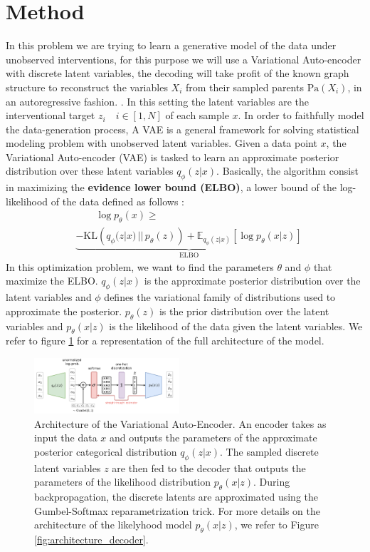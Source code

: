 \documentclass{article}
\begin{document}
\section{Method}\label{subsec:Method}
In this problem we are trying to learn a generative model of the data under unobserved interventions, for this purpose we will use a Variational Auto-encoder \citep{kingma2022autoencodingvariationalbayes}
with discrete latent variables, the decoding will take profit of the known graph structure to reconstruct the variables $X_i$ from their sampled parents $\text{Pa}(X_i)$, in an autoregressive fashion.
. In this setting the latent variables are the interventional target $z_i \quad i \in [1,N]$ of each sample $x$. In order to faithfully model the data-generation process,
A VAE is a general framework for solving statistical modeling problem with unobserved latent variables. Given a data point $x$, the Variational Auto-encoder (VAE) is tasked to learn an approximate posterior distribution over these latent variables $q_\phi(z | x)$. Basically, the algorithm consist in maximizing the \textbf{evidence lower bound (ELBO)}, a lower bound of the log-likelihood of the data defined as follows :
\begin{align*}
    &\quad\quad \log p_\theta(x) \geq  \\
    & \underbrace{ - \text{KL}\left(q_\phi(z | x) \,||\, p_\theta(z)\right)+ \mathbb{E}_{q_\phi(z | x)} \left[ \log p_\theta(x | z) \right]}_{\text{ELBO}}
\end{align*}
In this optimization problem, we want to find the parameters $\theta$ and $\phi$ that maximize the ELBO. $q_\phi(z | x)$ is the approximate posterior distribution over the latent variables and $\phi$ defines the variational family of distributions used to approximate the posterior. $p_\theta(z)$ is the prior distribution over the latent variables and $p_\theta(x | z)$ is the likelihood of the data given the latent variables. We refer to figure \ref{fig:architecture} for a representation of the full architecture of the model.
\begin{figure}
\centering
    \includegraphics[width=0.48\textwidth]{images/architecture.pdf}
    \caption{Architecture of the Variational Auto-Encoder. An encoder takes as input the data $x$ and outputs the parameters of the approximate posterior categorical distribution $q_\phi(z | x)$. The sampled discrete latent variables $z$ are then fed to the decoder that outputs the parameters of the likelihood distribution $p_\theta(x | z)$. During backpropagation, the discrete latents are approximated using the Gumbel-Softmax reparametrization trick. For more details on the architecture of the likelyhood model $p_\theta(x | z)$, we refer to Figure \ref{fig:architecture_decoder}.}
    \label{fig:architecture}
\end{figure}
\end{document}
